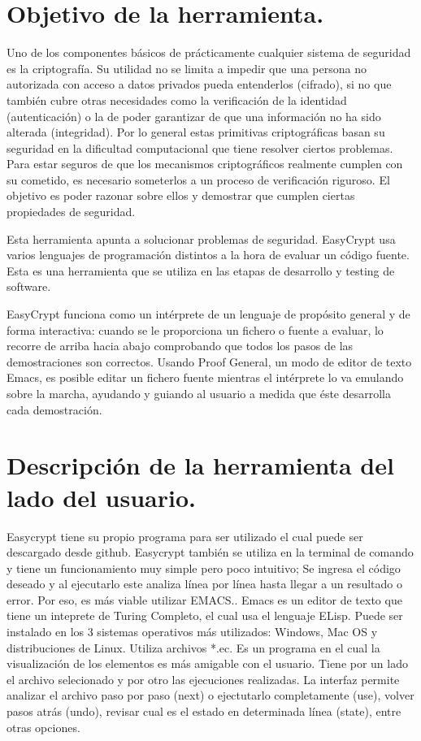 \documentclass[runningheads,a4paper]{llncs}
\begin{document}
\section{Objetivo de la herramienta.} 
Uno de los componentes básicos de prácticamente cualquier sistema de seguridad es la criptografía. Su utilidad no se limita a impedir que una persona no autorizada con acceso a datos privados pueda entenderlos (cifrado), si no que también cubre otras necesidades como la verificación de la identidad (autenticación) o la de poder garantizar de que una información no ha sido alterada (integridad). Por lo general estas primitivas criptográficas basan su seguridad en la dificultad computacional que tiene resolver ciertos problemas. Para estar seguros de que los mecanismos criptográficos realmente cumplen con su cometido, es necesario someterlos a un proceso de verificación riguroso. El objetivo es poder razonar sobre ellos y demostrar que cumplen ciertas propiedades de seguridad. 

Esta herramienta apunta a solucionar problemas de seguridad. EasyCrypt usa varios lenguajes de programación distintos a la hora de evaluar un código fuente. Esta es una herramienta que se utiliza en las etapas de desarrollo y testing de software. 

EasyCrypt funciona como un intérprete de un lenguaje de propósito general y de forma interactiva: cuando se le proporciona un fichero o fuente a evaluar, lo recorre de arriba hacia abajo comprobando que todos los pasos de las demostraciones son correctos. Usando Proof General, un modo de editor de texto Emacs, es posible editar un fichero fuente mientras el intérprete lo va emulando sobre la marcha, ayudando y guiando al usuario a medida que éste desarrolla cada demostración. 

\section{Descripción de la herramienta del lado del usuario.}

Easycrypt tiene su propio programa para ser utilizado el cual puede ser descargado desde github.\cite{link1}
Easycrypt también se utiliza en la terminal de comando y tiene un funcionamiento muy simple pero poco intuitivo; Se ingresa el código deseado y al ejecutarlo este analiza línea por línea hasta llegar a un resultado o error. Por eso, es más viable utilizar EMACS.\cite{link2}. Emacs es un editor de texto que tiene un inteprete de Turing Completo, el cual usa el lenguaje ELisp. Puede ser instalado en los 3 sistemas operativos más utilizados: Windows, Mac OS y distribuciones de Linux. Utiliza archivos *.ec. Es un programa en el cual la visualización de los elementos es más amigable con el usuario. Tiene por un lado el archivo selecionado y por otro las ejecuciones realizadas. La interfaz permite analizar el archivo paso por paso (next) o ejectutarlo completamente (use), volver pasos atrás (undo), revisar cual es el estado en determinada línea (state), entre otras opciones.
\end{document}

